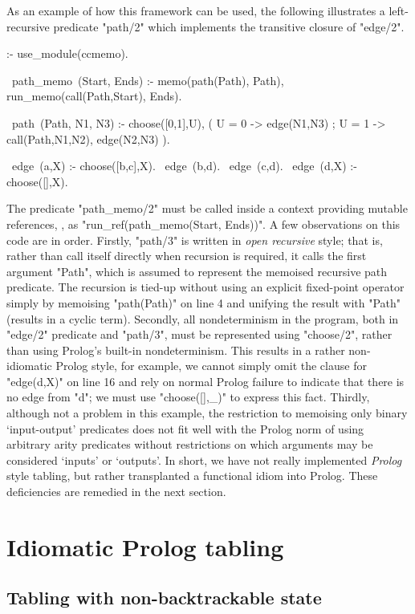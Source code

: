 As an example of how this framework can be used, the following illustrates a left-recursive
predicate "path/2" which implements the transitive closure of "edge/2".
\begin{prolog-framed}[numbers=left]
  :- use_module(ccmemo).

  ~path_memo~(Start, Ends) :-
    memo(path(Path), Path),
    run_memo(call(Path,Start), Ends).

  ~path~(Path, N1, N3) :- 
    choose([0,1],U), 
    ( U = 0 -> edge(N1,N3)
    ; U = 1 -> call(Path,N1,N2), edge(N2,N3)
    ).

  ~edge~(a,X) :- choose([b,c],X).
  ~edge~(b,d).
  ~edge~(c,d).
  ~edge~(d,X) :- choose([],X).
\end{prolog-framed}
The predicate "path_memo/2" must be called inside a context providing mutable references, \eg, as
"run_ref(path_memo(Start, Ends))".
A few observations on this code are in order. Firstly, "path/3" is written in \emph{open recursive} style;
that is, rather than call itself directly when recursion is required, it calls the first argument "Path", which
is assumed to represent the memoised recursive path predicate. The recursion is tied-up without using
an explicit fixed-point operator simply by memoising "path(Path)" on line 4 and unifying the result with "Path"
(results in a cyclic term). Secondly, all nondeterminism in the
program, both in "edge/2" predicate and "path/3", must be represented using "choose/2",
rather than using Prolog's built-in nondeterminism. This results in a rather non-idiomatic Prolog style, for
example, we cannot simply omit the clause for "edge(d,X)" on line 16 and rely on normal Prolog failure to indicate that there is no edge 
from "d"; we must use "choose([],_)" to express this fact. Thirdly, although not a problem in this example,
the restriction to memoising only binary `input-output' predicates does not fit well with the Prolog norm
of using arbitrary arity predicates without restrictions on which arguments may be considered
`inputs' or `outputs'. In short, we have not really implemented \emph{Prolog} style tabling, but rather
transplanted a functional idiom into Prolog. These deficiencies are remedied in the next section.


\section{Idiomatic Prolog tabling}
\label{sec:idiomatic}

\subsection{Tabling with non-backtrackable state}
\label{sec:ccnbstate}

